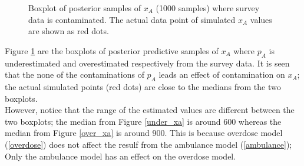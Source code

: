 \documentclass[]{article}
\begin{document}
\begin{figure}[htb]
	\centering
	\caption[two early result box plots:xa]{Boxplot of posterior samples of $x_A$ (1000 samples) where survey data is contaminated.  The actual data point of simulated $x_A$ values are shown as red dots.}
	\label{contam_xt}
\end{figure}

Figure \ref{contam_xt}  are the boxplots of posterior predictive samples of $x_A$ where $p_A$ is underestimated and overestimated respectively from the survey data. It is seen that the none of the contaminations of $p_A$ leads an effect of contamination on $x_A$; the actual simulated points (red dots) are close to the medians from the two boxplots. \\

However, notice that the range of the estimated values are different between the two boxplots; the median from Figure \ref{under_xa} is around 600 whereas the median from Figure \ref{over_xa} is around 900. This is because overdose model (\ref{overdose}) does not affect the resulf from the ambulance model (\ref{ambulance}); Only the ambulance model has an effect on the overdose model. 






\end{document}
